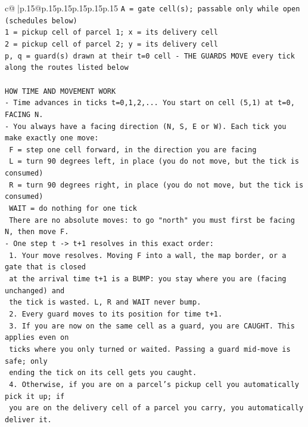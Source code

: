 \documentclass{article}
\begin{document}
{\begin{supertabular}{c@{$\;$}|p{.15\linewidth}@{}p{.15\linewidth}p{.15\linewidth}p{.15\linewidth}p{.15\linewidth}p{.15\linewidth}}
{{{\texttt{A = gate cell(s); passable only while open (schedules below)} \\
\texttt{1 = pickup cell of parcel 1; x = its delivery cell} \\
\texttt{2 = pickup cell of parcel 2; y = its delivery cell} \\
\texttt{p, q = guard(s) drawn at their t=0 cell {-} THE GUARDS MOVE every tick along the routes listed below} \\
\\ 
\texttt{HOW TIME AND MOVEMENT WORK} \\
\texttt{{-} Time advances in ticks t=0,1,2,... You start on cell (5,1) at t=0, FACING N.} \\
\texttt{{-} You always have a facing direction (N, S, E or W). Each tick you make exactly one move:} \\
\texttt{  F    = step one cell forward, in the direction you are facing} \\
\texttt{  L    = turn 90 degrees left, in place (you do not move, but the tick is consumed)} \\
\texttt{  R    = turn 90 degrees right, in place (you do not move, but the tick is consumed)} \\
\texttt{  WAIT = do nothing for one tick} \\
\texttt{  There are no absolute moves: to go "north" you must first be facing N, then move F.} \\
\texttt{{-} One step t {-}> t+1 resolves in this exact order:} \\
\texttt{  1. Your move resolves. Moving F into a wall, the map border, or a gate that is closed} \\
\texttt{     at the arrival time t+1 is a BUMP: you stay where you are (facing unchanged) and} \\
\texttt{     the tick is wasted. L, R and WAIT never bump.} \\
\texttt{  2. Every guard moves to its position for time t+1.} \\
\texttt{  3. If you are now on the same cell as a guard, you are CAUGHT. This applies even on} \\
\texttt{     ticks where you only turned or waited. Passing a guard mid{-}move is safe; only} \\
\texttt{     ending the tick on its cell gets you caught.} \\
\texttt{  4. Otherwise, if you are on a parcel's pickup cell you automatically pick it up; if} \\
\texttt{     you are on the delivery cell of a parcel you carry, you automatically deliver it.} \\
}}}
\end{supertabular}}
\end{document}
